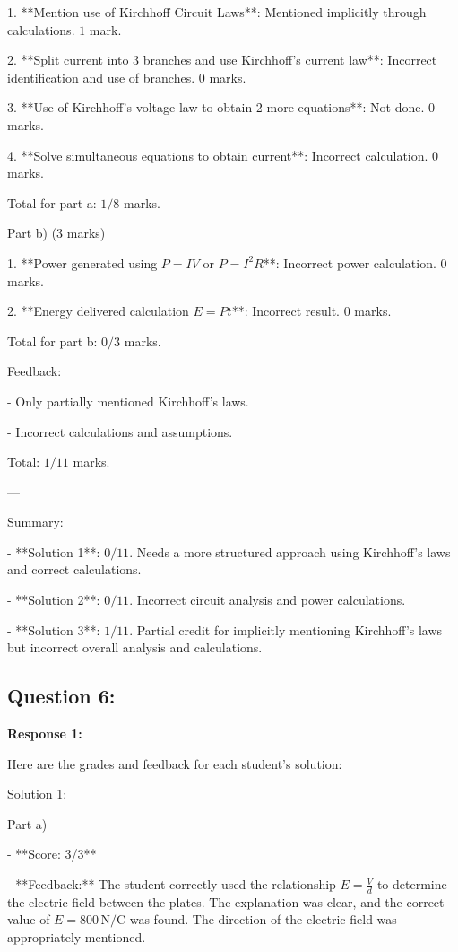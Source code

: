 \documentclass[a4paper,11pt]{article}
\begin{document}
1. **Mention use of Kirchhoff Circuit Laws**: Mentioned implicitly through calculations. \(1\) mark.

2. **Split current into 3 branches and use Kirchhoff’s current law**: Incorrect identification and use of branches. \(0\) marks.

3. **Use of Kirchhoff’s voltage law to obtain 2 more equations**: Not done. \(0\) marks.

4. **Solve simultaneous equations to obtain current**: Incorrect calculation. \(0\) marks.

Total for part a: \(1/8\) marks.

Part b) (3 marks)

1. **Power generated using \( P = IV \) or \( P = I^2 R \)**: Incorrect power calculation. \(0\) marks.

2. **Energy delivered calculation \( E = P t \)**: Incorrect result. \(0\) marks.

Total for part b: \(0/3\) marks.

Feedback:

- Only partially mentioned Kirchhoff's laws.

- Incorrect calculations and assumptions.

Total: \(1/11\) marks.

---

Summary:

- **Solution 1**: \(0/11\). Needs a more structured approach using Kirchhoff’s laws and correct calculations.

- **Solution 2**: \(0/11\). Incorrect circuit analysis and power calculations.

- **Solution 3**: \(1/11\). Partial credit for implicitly mentioning Kirchhoff's laws but incorrect overall analysis and calculations.

\subsection*{Question 6:}

\textbf{Response 1:}

Here are the grades and feedback for each student's solution:

Solution 1:

Part a)

- **Score: 3/3**

- **Feedback:** The student correctly used the relationship \(E = \frac{V}{d}\) to determine the electric field between the plates. The explanation was clear, and the correct value of \(E = 800 \, \text{N/C}\) was found. The direction of the electric field was appropriately mentioned.
\end{document}
